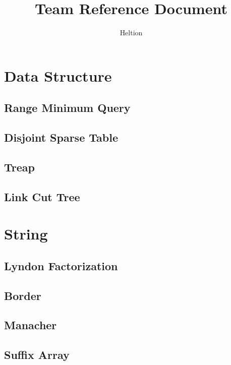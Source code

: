 \documentclass{article}
\begin{document}
\title{Team Reference Document}
\author{Heltion}
\maketitle
\newpage
\begin{multicols}{2}
    \tableofcontents
    \newpage
    \section{Data Structure}
    \subsection{Range Minimum Query}
    
    \subsection{Disjoint Sparse Table}
    
    \subsection{Treap}
    
    \subsection{Link Cut Tree}
    

    \section{String}
    \subsection{Lyndon Factorization}
    
    \subsection{Border}
    
    \subsection{Manacher}
    
    \subsection{Suffix Array}
    
    

\end{multicols}
\end{document}
